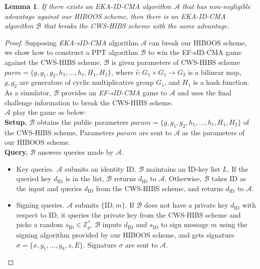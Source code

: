 \documentclass[times]{secauth}
\newtheorem{lemma}[theorem]{Lemma}
\theoremstyle{definition}
\theoremstyle{remark}
\begin{document}
\begin{lemma} \label{lemma-eps-hiboos}
If there exists an EKA-ID-CMA algorithm $\mathcal{A}$ that has non-negligible advantage against our HIBOOS scheme, 
then there is an EKA-ID-CMA algorithm $\mathcal{B}$ that breaks the CWS-HIBS scheme with the same advantage.
\end{lemma}
\begin{proof}
Supposing \emph{EKA-sID-CMA} algorithm $\mathcal{A}$ can break our HIBOOS scheme, we show how to construct a PPT algorithm $\mathcal{B}$ to win the EF-sID-CMA game against the CWS-HIBS scheme.
$\mathcal{B}$ is given parameters of CWS-HIBS scheme $parm = \{g, g_1,  g_2, h_1, \ldots, h_\ell, H_1, H_2\}$, where $\hat{e}: G_1 \times G_1 \rightarrow G_2$ is a bilinear map, $g, g_2$ are generators of cyclic multiplicative group $G_1$, and $H_1$ is a hash function. 
As a simulator, $\mathcal{B}$ provides an \emph{EF-sID-CMA} game to $\mathcal{A}$ and uses the final challenge information to break the CWS-HIBS scheme.\\
$\mathcal{A}$ play the game as below:
\vspace{0.2cm}
\\
\textbf{Setup.} 
$\mathcal{B}$ obtains the public parameters $param = \{g, g_1,  g_2, h_1, \ldots, h_\ell, H_1, H_2\}$ of the CWS-HIBS scheme,
Parameters $param$ are sent to $\mathcal{A}$ as the parameters of our HIBOOS scheme.
\vspace{0.2cm}
\\
\textbf{Query.} $\mathcal{B}$ answers queries made by $\mathcal{A}$. 
\begin{itemize}
	\item Key queries. 
	$\mathcal{A}$ submits an identity $\mathrm{ID}$. 
	$\mathcal{B}$ maintains an ID-key list $L$. 
	If the queried key $d_\mathrm{ID}$ is in the list, $\mathcal{B}$ returns $d_{\mathrm{ID}}$ to $\mathcal{A}$.
	Otherwise, $\mathcal{B}$ takes $\mathrm{ID}$ as the input and queries $d_{\mathrm{ID}}$ from the CWS-HIBS scheme, and returns $d_{\mathrm{ID}}$ to $\mathcal{A}$. 
	\item Signing queries. 
	$\mathcal{A}$ submits $\{\mathrm{ID}, m\}$. 
	If $\mathcal{B}$ does not have a private key $d_{\mathrm{ID}}$ with respect to ID, it queries the private key from the CWS-HIBS scheme and picks a random $s_\mathrm{ID} \in \mathbb{Z}_p^*$. 
	$\mathcal{B}$ inputs $d_\mathrm{ID}$ and $s_\mathrm{ID}$ to sign message $m$ using the signing algorithm provided by our HIBOOS scheme, and gets signature $\sigma = \{x, y_1, \ldots, y_k, z, E\}$.
	Signature $\sigma$ are sent to $\mathcal{A}$.

\end{itemize}
\end{proof}
\end{document}
